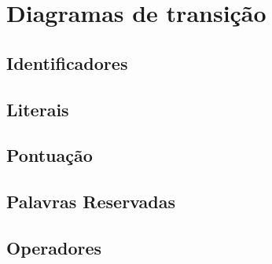 \documentclass{article}
\begin{document}
	\section{Diagramas de transição}
	
	\subsection{Identificadores}
	\subsection{Literais}
	\subsection{Pontuação}
	\subsection{Palavras Reservadas}
	\subsection{Operadores}
	
\end{document}
